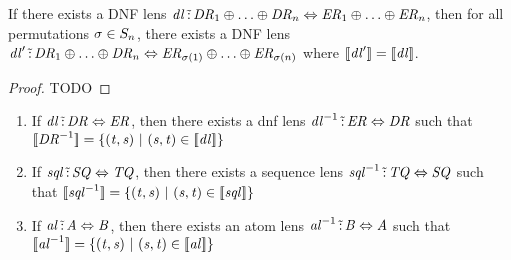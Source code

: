 \documentclass[numbers,10pt,preprint\ifanon ,nocopyrightspace\fi]{sigplanconf}
\begin{document}
\begin{lemma}
  \label{lem:or-dnf-reordering-right}
  If there exists a DNF lens $\mathit{dl} \,\tilde{:}\, \mathit{DR}_1 \oplus \ldots
  \oplus \mathit{DR}_n \Leftrightarrow
  \mathit{ER}_1 \oplus \ldots \oplus \mathit{ER}_n$, then for all permutations
  $\sigma \in S_{n}$, there exists a DNF lens $\mathit{dl}'
  \,\tilde{:}\, \mathit{DR}_1 \oplus \ldots \oplus \mathit{DR}_n
  \Leftrightarrow
  \mathit{ER}_{\sigma(1)} \oplus \ldots \oplus \mathit{ER}_{\sigma(n)}$ where
  $[ \! [\mathit{dl}'] \! ] = [ \! [\mathit{dl}] \! ]$.
\end{lemma}
\begin{proof}
  TODO
\end{proof}

\begin{lemma}
  \label{lem:closure-inversion}
  \leavevmode
  \begin{enumerate}
  \item If
    $\mathit{dl} \,\tilde{:}\, \mathit{DR} \Leftrightarrow \mathit{ER}$,
    then there exists a dnf lens
    $\mathit{dl}^{-1} \,\tilde{:}\,
    \mathit{ER} \Leftrightarrow \mathit{DR}$
    such that
    $[ \! [\mathit{DR}^{-1}] \! ] =
    \{(\mathit{t},\mathit{s}) ~|~ (\mathit{s},\mathit{t}) \in
      [ \! [\mathit{dl}] \! ]\}$
  \item If
    $\mathit{sql} \,\tilde{:}\, \mathit{SQ} \Leftrightarrow \mathit{TQ}$,
    then there exists a sequence lens
    $\mathit{sql}^{-1} \,\tilde{:}\,
    \mathit{TQ} \Leftrightarrow \mathit{SQ}$ such that
    $[ \! [\mathit{sql}^{-1}] \! ] =
    \{(\mathit{t},\mathit{s}) ~|~ (\mathit{s},\mathit{t}) \in
      [ \! [\mathit{sql}] \! ]\}$
  \item If
    $\mathit{al} \,\tilde{:}\, \mathit{A} \Leftrightarrow \mathit{B}$,
    then there exists an atom lens
    $\mathit{al}^{-1} \,\tilde{:}\,
    \mathit{B} \Leftrightarrow \mathit{A}$ such that
    $[ \! [\mathit{al}^{-1}] \! ] =
    \{(\mathit{t},\mathit{s}) ~|~ (\mathit{s},\mathit{t}) \in
      [ \! [\mathit{al}] \! ]\}$
  \end{enumerate}
\end{lemma}
\end{document}
